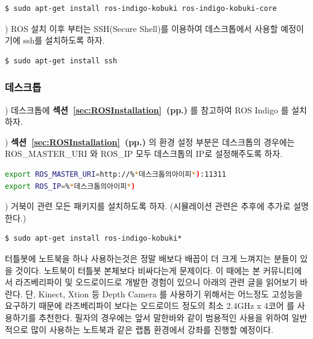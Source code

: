 \begin{lstlisting}[language=ROS]
$ sudo apt-get install ros-indigo-kobuki ros-indigo-kobuki-core
\end{lstlisting}

\vspace{\baselineskip}
\noindent{}
\thenum) ROS 설치 이후 부터는 SSH(Secure Shell)를 이용하여 데스크톱에서 사용할 예정이기에  ssh를 설치하도록 하자.

\begin{lstlisting}[language=ROS]
$ sudo apt-get install ssh
\end{lstlisting}

\subsubsection{데스크톱}

\vspace{\baselineskip}
\noindent{}
\thenum) 데스크톱에 \textbf{섹션~\ref{sec:ROSInstallation}~(pp.\pageref{sec:ROSInstallation})} 를 참고하여 ROS Indigo 를 설치하자. 

\vspace{\baselineskip}
\noindent{}
\thenum) \textbf{섹션~\ref{sec:ROSInstallation}~(pp.\pageref{sec:ROSInstallation})} 의 환경 설정 부분은 데스크톱의 경우에는 ROS\_MASTER\_URI 와 ROS\_IP 모두 데스크톱의 IP로 설정해주도록 하자. 

\begin{lstlisting}[language=bash]
export ROS_MASTER_URI=http://%*데스크톱의아이피*):11311
export ROS_IP=%*데스크톱의아이피*)
\end{lstlisting}

\vspace{\baselineskip}
\noindent{}
\thenum) 거북이 관련 모든 패키지를 설치하도록 하자. (시뮬레이션 관련은 추후에 추가로 설명한다.)

\begin{lstlisting}[language=ROS]
$ sudo apt-get install ros-indigo-kobuki*
\end{lstlisting}

\begin{corollary}
터틀봇에 노트북을 하나 사용하는것은 정말 배보다 배꼽이 더 크게 느껴지는 분들이 있을 것이다. 노트북이 터틀봇 본체보다 비싸다는게 문제이다. 이 때에는 본 커뮤니티에서 라즈베리파이 및 오드로이드로 개발한 경험이 있으니 아래의 관련 글을 읽어보기 바란다. 단, Kinect, Xtion 등 Depth Camera 를 사용하기 위해서는 어느정도 고성능을 요구하기 때문에 라즈베리파이 보다는 오드로이드 정도의 최소 2.4GHz x 4코어 를 사용하기를 추천한다. 필자의 경우에는 앞서 말한바와 같이 범용적인 사용을 위하여 일반적으로 많이 사용하는 노트북과 같은 랩톱 환경에서 강좌를 진행할 예정이다. 
\end{corollary}


